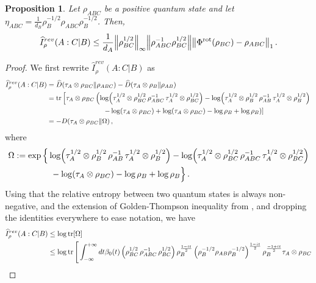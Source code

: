 \documentclass[11pt]{article}
\theoremstyle{newdefinition}
\theoremstyle{newplain}
\newtheorem{proposition}[definition]{Proposition}
\theoremstyle{myplain}
\DeclareMathOperator{\1}{\mathds{1}}
\begin{document}
{\begin{proposition}
 Let $\rho_{ABC}$ be a positive quantum state and let $\eta_{ABC}= \frac{1}{d_B} \rho_B^{-1/2} \rho_{ABC}\rho_B^{-1/2} $. Then,
 \begin{equation}
      \widehat{I}^{rev}_{\rho}(A:C | B) \leq \frac{1}{d_A} \norm{\rho_{BC}^{1/2}}_\infty \norm{\rho_{ABC}^{-1} \rho_{BC}^{1/2}} \norm{  \Phi^{\text{rot}} (\rho_{BC}) -\rho_{ABC}}_1 \, .
 \end{equation}
\end{proposition}

\begin{proof}

We first rewrite $\widehat{I}^{rev}_{\rho}(A:C | B) $ as 
\begin{align}
    \widehat{I}^{rev}_{\rho}(A:C | B) & =  \widehat{D}(\tau_A \otimes \rho_{BC} \| \rho_{ABC}) - \widehat{D}(\tau_A \otimes \rho_{B} \| \rho_{AB}) \\
    & = \tr \left[ \tau_{A} \otimes \rho_{BC} \left( \log (\tau_A^{1/2} \otimes \rho_{BC}^{1/2} \, \rho_{ABC}^{-1} \, \tau_A^{1/2} \otimes \rho_{BC}^{1/2}  ) - \log (\tau_A^{1/2} \otimes \rho_{B}^{1/2} \, \rho_{AB}^{-1} \, \tau_A^{1/2} \otimes \rho_{B}^{1/2}  ) \right. \right. \\
    & \hspace{2.8cm} \left. \left. -\log (\tau_A \otimes \rho_{BC}) + \log (\tau_A \otimes \rho_{BC}) - \log \rho_B + \log \rho_B    \right) \right] \\
    & = - D( \tau_{A} \otimes \rho_{BC}  \| \Omega) \, ,
\end{align}
where 
\begin{align}
    \Omega& := \exp \Big\{  \log (\tau_A^{1/2} \otimes \rho_{B}^{1/2} \, \rho_{AB}^{-1} \, \tau_A^{1/2} \otimes \rho_{B}^{1/2}  ) - \log (\tau_A^{1/2} \otimes \rho_{BC}^{1/2} \, \rho_{ABC}^{-1} \, \tau_A^{1/2} \otimes \rho_{BC}^{1/2}  )  \\
    & \hspace{1.5cm} -\log (\tau_A \otimes \rho_{BC}) - \log \rho_B + \log \rho_B   \Big\} \, .
\end{align}
Using that the relative entropy between two quantum states is always non-negative, and the extension of Golden-Thompson inequality from \cite{Sutter2017b}, and dropping the identities everywhere to ease notation, we have
\begin{align}
    \widehat{I}^{rev}_{\rho}(A:C | B) & \leq \log \tr[ \Omega ] \\
    & \leq \log \tr \Bigg[  \int_{-\infty}^{+\infty} dt \beta_0(t)  \left( \rho_{BC}^{1/2} \, \rho_{ABC}^{-1} \, \rho_{BC}^{1/2}  \right) \rho_B^{\frac{1-it}{2}} \left(\rho_B^{-1/2}\rho_{AB}\rho_B^{-1/2}\right)^{\frac{1-it}{2}}  \rho_B^{\frac{-1+it}{2}} \tau_A \otimes \rho_{BC}  \\

\end{align}
\end{proof}}
\end{document}
